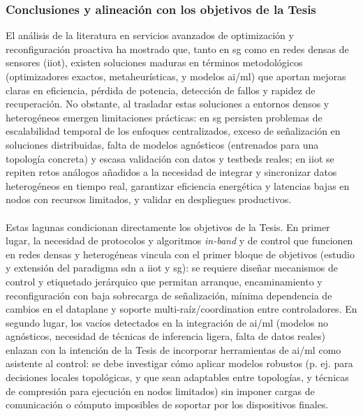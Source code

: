 \subsubsection{Conclusiones y alineación con los objetivos de la Tesis}

El análisis de la literatura en servicios avanzados de optimización y reconfiguración proactiva ha mostrado que, tanto en \gls{sg} como en redes densas de sensores (\gls{iiot}), existen soluciones maduras en términos metodológicos (optimizadores exactos, metaheurísticas, y modelos \gls{ai}/\gls{ml}) que aportan mejoras claras en eficiencia, pérdida de potencia, detección de fallos y rapidez de recuperación. No obstante, al trasladar estas soluciones a entornos densos y heterogéneos emergen limitaciones prácticas: en \gls{sg} persisten problemas de escalabilidad temporal de los enfoques centralizados, exceso de señalización en soluciones distribuidas, falta de modelos agnósticos (entrenados para una topología concreta) y escasa validación con datos y testbeds reales; en \gls{iiot} se repiten retos análogos añadidos a la necesidad de integrar y sincronizar datos heterogéneos en tiempo real, garantizar eficiencia energética y latencias bajas en nodos con recursos limitados, y validar en despliegues productivos.\\
\\
Estas lagunas condicionan directamente los objetivos de la Tesis. En primer lugar, la necesidad de protocolos y algoritmos \emph{in-band} y de control que funcionen en redes densas y heterogéneas vincula con el primer bloque de objetivos (estudio y extensión del paradigma \gls{sdn} a \gls{iiot} y \gls{sg}): se requiere diseñar mecanismos de control y etiquetado jerárquico que permitan arranque, encaminamiento y reconfiguración con baja sobrecarga de señalización, mínima dependencia de cambios en el dataplane y soporte multi-raíz/coordination entre controladores. En segundo lugar, los vacíos detectados en la integración de \gls{ai}/\gls{ml} (modelos no agnósticos, necesidad de técnicas de inferencia ligera, falta de datos reales) enlazan con la intención de la Tesis de incorporar herramientas de \gls{ai}/\gls{ml} como asistente al control: se debe investigar cómo aplicar modelos robustos (p. ej. para decisiones locales topológicas, y que sean adaptables entre topologías, y técnicas de compresión para ejecución en nodos limitados) sin imponer cargas de comunicación o cómputo imposibles de soportar por los dispositivos finales.\\
\\

